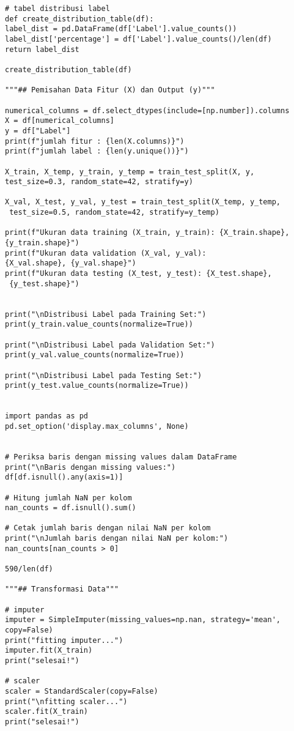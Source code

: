 \documentclass[a4paper,12pt]{report}
\begin{document}
\begin{lstlisting}
# tabel distribusi label
def create_distribution_table(df):
label_dist = pd.DataFrame(df['Label'].value_counts())
label_dist['percentage'] = df['Label'].value_counts()/len(df)
return label_dist

create_distribution_table(df)

"""## Pemisahan Data Fitur (X) dan Output (y)"""

numerical_columns = df.select_dtypes(include=[np.number]).columns
X = df[numerical_columns]
y = df["Label"]
print(f"jumlah fitur : {len(X.columns)}")
print(f"jumlah label : {len(y.unique())}")

X_train, X_temp, y_train, y_temp = train_test_split(X, y, test_size=0.3, random_state=42, stratify=y)

X_val, X_test, y_val, y_test = train_test_split(X_temp, y_temp,
 test_size=0.5, random_state=42, stratify=y_temp)

print(f"Ukuran data training (X_train, y_train): {X_train.shape}, 
{y_train.shape}")
print(f"Ukuran data validation (X_val, y_val): 
{X_val.shape}, {y_val.shape}")
print(f"Ukuran data testing (X_test, y_test): {X_test.shape},
 {y_test.shape}")


print("\nDistribusi Label pada Training Set:")
print(y_train.value_counts(normalize=True))

print("\nDistribusi Label pada Validation Set:")
print(y_val.value_counts(normalize=True))

print("\nDistribusi Label pada Testing Set:")
print(y_test.value_counts(normalize=True))


import pandas as pd
pd.set_option('display.max_columns', None)


# Periksa baris dengan missing values dalam DataFrame
print("\nBaris dengan missing values:")
df[df.isnull().any(axis=1)]

# Hitung jumlah NaN per kolom
nan_counts = df.isnull().sum()

# Cetak jumlah baris dengan nilai NaN per kolom
print("\nJumlah baris dengan nilai NaN per kolom:")
nan_counts[nan_counts > 0]

590/len(df)

"""## Transformasi Data"""

# imputer
imputer = SimpleImputer(missing_values=np.nan, strategy='mean', 
copy=False)
print("fitting imputer...")
imputer.fit(X_train)
print("selesai!")

# scaler
scaler = StandardScaler(copy=False)
print("\nfitting scaler...")
scaler.fit(X_train)
print("selesai!")


\end{lstlisting}
\end{document}
